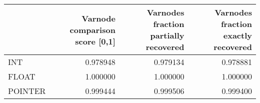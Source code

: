 \begin{tabular}{lrrr}
\toprule
{} &  Varnode comparison score [0,1] &  Varnodes fraction partially recovered &  Varnodes fraction exactly recovered \\
\midrule
INT     &                        0.978948 &                               0.979134 &                             0.978881 \\
FLOAT   &                        1.000000 &                               1.000000 &                             1.000000 \\
POINTER &                        0.999444 &                               0.999506 &                             0.999400 \\
\bottomrule
\end{tabular}
